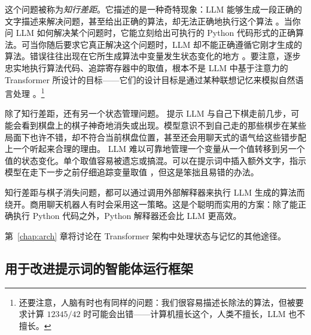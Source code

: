 这个问题被称为{\em 知行差距}。它描述的是一种奇特现象：LLM 能够生成一段正确的文字描述来解决问题，甚至给出正确的算法，却无法正确地执行这个算法 \citep{paglieri2024balrog}。当你问 LLM 如何解决某个问题时，它能立刻给出可执行的 Python 代码形式的正确算法。可当你随后要求它真正解决这个问题时，LLM 却不能正确遵循它刚才生成的算法。错误往往出现在它所生成算法中变量发生状态变化的地方 \citep{paglieri2024balrog,ruoss2024lmact}。要注意，逐步忠实地执行算法代码、追踪寄存器中的取值，根本不是 LLM 中基于注意力的 Transformer 所设计的目标——它们的设计目标是通过某种联想记忆来模拟自然语言处理 \citep{la2024code}。\footnote{还要注意，人脑有时也有同样的问题：我们很容易描述长除法的算法，但被要求计算 $12345/42$ 时可能会出错——计算机擅长这个，人类不擅长，LLM 也不擅长。}

除了知行差距，还有另一个状态管理问题。
提示 LLM 与自己下棋走前几步，可能会看到棋盘上的棋子神奇地消失或出现。模型意识不到自己走的那些棋步在某些局面下也许不错，却不符合当前棋盘位置，甚至还会用聊天式的语气给这些错步配上一个听起来合理的理由。%
LLM 难以可靠地管理一个变量从一个值转移到另一个值的状态变化。单个取值容易被遗忘或搞混。可以在提示词中插入额外文字，指示模型在走下一步之前仔细追踪变量取值 \citep{la2024code}，但这是笨拙且易错的办法。%

知行差距与棋子消失问题，都可以通过调用外部解释器来执行 LLM 生成的算法而绕开。商用聊天机器人有时会采用这一策略。这是个聪明而实用的方案：除了能正确执行 Python 代码之外，Python 解释器还会比 LLM 更高效。

第~\ref{chap:arch} 章将讨论在 Transformer 架构中处理状态与记忆的其他途径。

\subsection{用于改进提示词的智能体运行框架}\label{sec:self-reflection}\label{sec:inferencetime}

